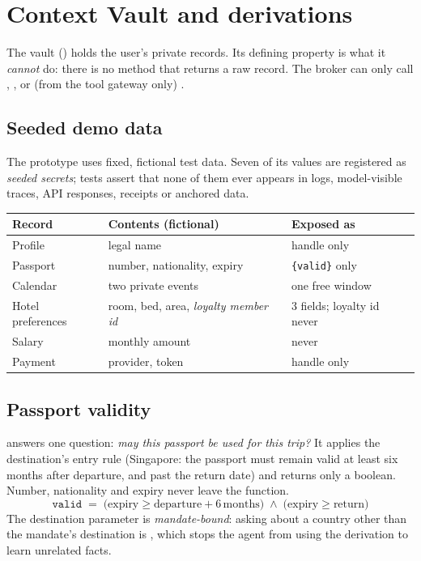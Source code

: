 \documentclass[11pt,a4paper]{article}
\newcommand{\lit}[1]{\texttt{\color{indigo}#1}}
\begin{document}
\section{Context Vault and derivations}\label{sec:vault}

The vault () holds the user's private records. Its defining property is what it \emph{cannot} do: there is no method that returns a raw record. The broker can only call , , or (from the tool gateway only) .

\subsection{Seeded demo data}
The prototype uses fixed, fictional test data. Seven of its values are registered as \emph{seeded secrets}; tests assert that none of them ever appears in logs, model-visible traces, API responses, receipts or anchored data.

\begin{center}
\renewcommand{\arraystretch}{1.25}
\small
\begin{tabularx}{\textwidth}{@{}l Y l@{}}
\toprule
\textbf{Record} & \textbf{Contents (fictional)} & \textbf{Exposed as}\\
\midrule
Profile & legal name & handle only\\
Passport & number, nationality, expiry  & \lit{\{valid\}} only\\
Calendar & two private events & one free window\\
Hotel preferences & room, bed, area, \emph{loyalty member id} & 3 fields; loyalty id never\\
Salary & monthly amount & never\\
Payment & provider, token & handle only\\
\bottomrule
\end{tabularx}
\end{center}

\subsection{Passport validity}
 answers one question: \emph{may this passport be used for this trip?} It applies the destination's entry rule (Singapore: the passport must remain valid at least six months after departure, and past the return date) and returns only a boolean. Number, nationality and expiry never leave the function.
\[
\texttt{valid} \;=\; \big(\text{expiry} \geq \text{departure} + 6\,\text{months}\big) \;\wedge\; \big(\text{expiry} \geq \text{return}\big)
\]
The destination parameter is \emph{mandate-bound}: asking about a country other than the mandate's destination is , which stops the agent from using the derivation to learn unrelated facts.
\end{document}
